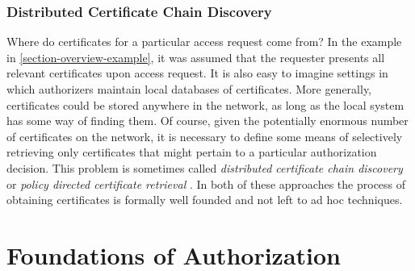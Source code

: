 %


\subsubsection{Distributed Certificate Chain Discovery} Where do 
certificates for a particular access request come from?  In the
example in \autoref{section-overview-example}, it was assumed that the
requester presents all relevant certificates upon access request.  It
is also easy to imagine settings in which authorizers maintain local
databases of certificates.  More generally, certificates could be
stored anywhere in the network, as long as the local system has some
way of finding them.  Of course, given the potentially enormous number
of certificates on the network, it is necessary to define some means
of selectively retrieving only certificates that might pertain to a
particular authorization decision.  This problem is sometimes called
\emph{distributed certificate chain discovery} \cite{Li:DCDTM} or
\emph{policy directed certificate retrieval} \cite{Gunter:PDCR}.  In
both of these approaches the process of obtaining certificates is formally
well founded and not left to ad hoc techniques.

\section{Foundations of Authorization}
\label{section-foundations}


